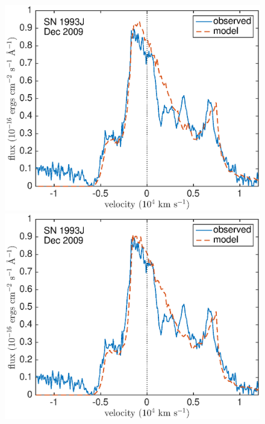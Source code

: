 \begin{figure}
\centering
\includegraphics[scale=0.4,clip=true, trim=20 0 40 20]{chapters/chapter6/figs/93J/smooth/OIII}
\includegraphics[scale=0.4,clip=true, trim=20 0 40 20]{chapters/chapter6/figs/93J/smooth/OIII_amC}


\end{figure}
